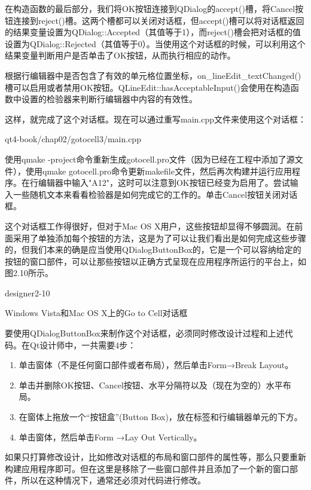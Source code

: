\documentclass[11pt,oneside]{book}
\begin{document}
\begin{common-format}
在构造函数的最后部分，我们将OK按钮连接到QDialog的accept()槽，将Cancel按钮连接到reject()槽。这两个槽都可以关闭对话框，但accept()槽可以将对话框返回的结果变量设置为QDialog::Accepted（其值等于1），而reject()槽会把对话框的值设置为QDialog::Rejected（其值等于0）。当使用这个对话框的时候，可以利用这个结果变量判断用户是否单击了OK按钮，从而执行相应的动作。

根据行编辑器中是否包含了有效的单元格位置坐标，on\_{}lineEdit\_{}textChang\linebreak ed()槽可以启用或者禁用OK按钮。QLineEdit::hasAcceptableInput()会使用在构造函数中设置的检验器来判断行编辑器中内容的有效性。

这样，就完成了这个对话框。现在可以通过重写main.cpp文件来使用这个对话框：
\begin{cppinput}{qt4-book/chap02/gotocell3/main.cpp}
\end{cppinput}

使用qmake -project命令重新生成gotocell.pro文件（因为已经在工程中添加了源文件），使用qmake gotocell.pro命令更新makefile文件，然后再次构建并运行应用程序。在行编辑器中输入"A12"，这时可以注意到OK按钮已经变为启用了。尝试输入一些随机文本来看看检验器是如何完成它的工作的。单击Cancel按钮关闭对话框。

这个对话框工作得很好，但对于Mac OS X用户，这些按钮却显得不够圆润。在前面采用了单独添加每个按钮的方法，这是为了可以让我们看出是如何完成这些步骤的，但我们本来的确是应当使用QDialogButtonBox的，它是一个可以容纳给定的按钮的窗口部件，可以让那些按钮以正确方式呈现在应用程序所运行的平台上，如图2.10所示。
\begin{fig}[0.7]{designer2-10}
\caption{Windows Vista和Mac OS X上的Go to Cell对话框}
\label{fig:designer2-10}
\end{fig}

要使用QDialogButtonBox来制作这个对话框，必须同时修改设计过程和上述代码。在Qt设计师中，一共需要4步：
\begin{enumerate}
\item 单击窗体（不是任何窗口部件或者布局），然后单击Form→Break Layout。
\item 单击并删除OK按钮、Cancel按钮、水平分隔符以及（现在为空的）水平布局。
\item 在窗体上拖放一个“按钮盒”(Button Box)，放在标签和行编辑器单元的下方。
\item 单击窗体，然后单击Form →Lay Out Vertically。
\end{enumerate}

如果只打算修改设计，比如修改对话框的布局和窗口部件的属性等，那么只要重新构建应用程序即可。但在这里是移除了一些窗口部件并且添加了一个新的窗口部件，所以在这种情况下，通常还必须对代码进行修改。


\end{common-format}
\end{document}
